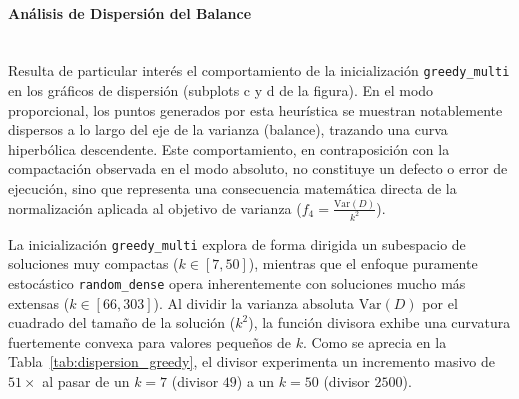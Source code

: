 \documentclass[a4paper,10pt]{article}
\begin{document}
\paragraph{Análisis de Dispersión del Balance}~\\
Resulta de particular interés el comportamiento de la inicialización \texttt{greedy\_multi} en los gráficos de dispersión (subplots c y d de la figura). En el modo proporcional, los puntos generados por esta heurística se muestran notablemente dispersos a lo largo del eje de la varianza (balance), trazando una curva hiperbólica descendente. Este comportamiento, en contraposición con la compactación observada en el modo absoluto, no constituye un defecto o error de ejecución, sino que representa una consecuencia matemática directa de la normalización aplicada al objetivo de varianza ($f_4 = \frac{\text{Var}(D)}{k^2}$).

La inicialización \texttt{greedy\_multi} explora de forma dirigida un subespacio de soluciones muy compactas ($k \in [7, 50]$), mientras que el enfoque puramente estocástico \texttt{random\_dense} opera inherentemente con soluciones mucho más extensas ($k \in [66, 303]$). Al dividir la varianza absoluta $\text{Var}(D)$ por el cuadrado del tamaño de la solución ($k^2$), la función divisora exhibe una curvatura fuertemente convexa para valores pequeños de $k$. Como se aprecia en la Tabla~\ref{tab:dispersion_greedy}, el divisor experimenta un incremento masivo de $51\times$ al pasar de un $k=7$ (divisor $49$) a un $k=50$ (divisor $2500$). 

\begin{table}[H]
\centering
\caption{Impacto empírico del divisor $k^2$ en la dispersión geométrica del balance para la heurística \texttt{greedy\_multi} (Modo Proporcional).}
\label{tab:dispersion_greedy}
\end{table}
\end{document}
